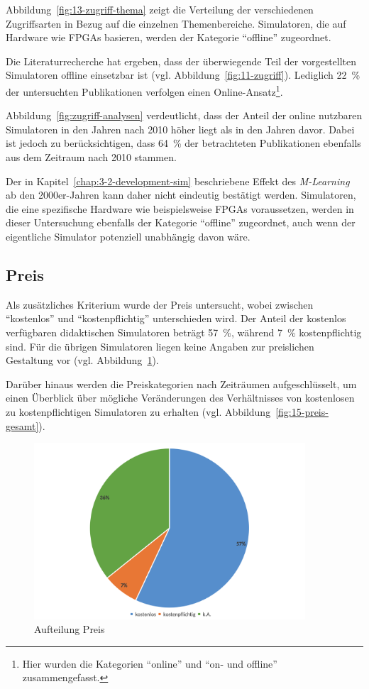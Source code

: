 Abbildung~\ref{fig:13-zugriff-thema} zeigt die Verteilung der verschiedenen Zugriffsarten in Bezug auf die einzelnen Themenbereiche. Simulatoren, die auf Hardware wie \ac{FPGA}s basieren, werden der Kategorie \enquote{offline} zugeordnet.

Die Literaturrecherche hat ergeben, dass der überwiegende Teil der vorgestellten Simulatoren offline einsetzbar ist (vgl. Abbildung~\ref{fig:11-zugriff}). Lediglich 22~\% der untersuchten Publikationen verfolgen einen Online-Ansatz\footnote{Hier wurden die Kategorien \enquote{online} und \enquote{on- und offline} zusammengefasst.}.

Abbildung~\ref{fig:zugriff-analysen} verdeutlicht, dass der Anteil der online nutzbaren Simulatoren in den Jahren nach 2010 höher liegt als in den Jahren davor. Dabei ist jedoch zu berücksichtigen, dass 64~\% der betrachteten Publikationen ebenfalls aus dem Zeitraum nach 2010 stammen.

Der in Kapitel~\ref{chap:3-2-development-sim} beschriebene Effekt des \textit{M-Learning} ab den 2000er-Jahren kann daher nicht eindeutig bestätigt werden. Simulatoren, die eine spezifische Hardware wie beispielsweise \ac{FPGA}s voraussetzen, werden in dieser Untersuchung ebenfalls der Kategorie \enquote{offline} zugeordnet, auch wenn der eigentliche Simulator potenziell unabhängig davon wäre.

\subsection{Preis}

Als zusätzliches Kriterium wurde der Preis untersucht, wobei zwischen \enquote{kostenlos} und \enquote{kostenpflichtig} unterschieden wird. Der Anteil der kostenlos verfügbaren didaktischen Simulatoren beträgt 57~\%, während 7~\% kostenpflichtig sind. Für die übrigen Simulatoren liegen keine Angaben zur preislichen Gestaltung vor (vgl. Abbildung~\ref{fig:14-preis2}). 

Darüber hinaus werden die Preiskategorien nach Zeiträumen aufgeschlüsselt, um einen Überblick über mögliche Veränderungen des Verhältnisses von kostenlosen zu kostenpflichtigen Simulatoren zu erhalten (vgl. Abbildung~\ref{fig:15-preis-gesamt}).

\begin{figure}[!htbp]
    \centering
    \includegraphics[width=0.9\textwidth]{graphics_lit/14-preis.png}
    \caption{Aufteilung Preis}
    \label{fig:14-preis2}
\end{figure}

